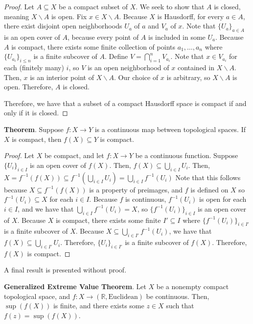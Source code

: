 \begin{framed}
\begin{proof}
        Let $A\subseteq X$ be a compact subset of $X$. We seek to show that $A$ is closed, meaning $X\backslash A$ is open. Fix $x\in X\backslash A$. Because $X$ is Hausdorff, for every $a\in A$, there exist disjoint open neighborhoods $U_a$ of $a$ and $V_a$ of $x$. Note that $\{U_a\}_{a\in A}$ is an open cover of $A$, because every point of $A$ is included in some $U_a$. Because $A$ is compact, there exists some finite collection of points $a_1,\dots,a_n$ where $\{U_{a_i}\}_{i\leq n}$ is a finite subcover of $A$. Define $V=\displaystyle\bigcap_{i=1}^n V_{a_i}$. Note that $x\in V_{a_i}$ for each (finitely many) $i$, so $V$ is an open neighborhood of $x$ contained in $X\backslash A$. Then, $x$ is an interior point of $X\backslash A$. Our choice of $x$ is arbitrary, so $X\backslash A$ is open. Therefore, $A$ is closed.

        Therefore, we have that a subset of a compact Hausdorff space is compact if and only if it is closed.
    \end{proof}

    \textbf{Theorem}. Suppose $f:X\to Y$ is a continuous map between topological spaces. If $X$ is compact, then $f(X)\subseteq Y$ is compact. \vspace{-1em}\begin{proof}
        Let $X$ be compact, and let $f:X\to Y$ be a continuous function. Suppose $\{U_i\}_{i\in I}$ is an open cover of $f(X)$. Then, $f(X)\subseteq \displaystyle\bigcup_{i\in I} U_i$. Then, $X = f^{-1}(f(X))\subseteq f^{-1}\left(\displaystyle\bigcup_{i\in I} U_i\right) = \displaystyle\bigcup_{i\in I} f^{-1}(U_i)$ Note that this follows because $X\subseteq f^{-1}(f(X))$ is a property of preimages, and $f$ is defined on $X$ so $f^{-1}(U_i)\subseteq X$ for each $i\in I$. Because $f$ is continuous, $f^{-1}(U_i)$ is open for each $i\in I$, and we have that $\displaystyle\bigcup_{i\in I}f^{-1}(U_i) = X$, so $\{f^{-1}(U_i)\}_{i\in I}$ is an open cover of $X$. Because $X$ is compact, there exists some finite $I'\subseteq I$ where $\{f^{-1}(U_i)\}_{i\in I'}$ is a finite subcover of $X$. Because $X\subseteq\displaystyle\bigcup_{i\in I'} f^{-1}(U_i)$, we have that $f(X)\subseteq \displaystyle\bigcup_{i\in I'} U_i$. Therefore, $\{U_i\}_{i\in I'}$ is a finite subcover of $f(X)$. Therefore, $f(X)$ is compact.
    \end{proof}

    A final result is presented without proof.

    \textbf{Generalized Extreme Value Theorem}. Let $X$ be a nonempty compact topological space, and $f:X\to(\mathbb{R},\text{Euclidean})$ be continuous. Then, $\sup(f(X))$ is finite, and there exists some $z\in X$ such that $f(z)=\sup(f(X))$.
\end{framed}

